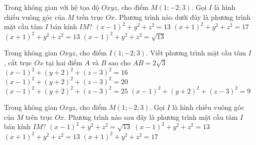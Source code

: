 \begin{ex}%
Trong không gian với hệ tọa độ $Oxyz$, cho điểm $M(1;-2;3)$. Gọi $I$ là hình chiếu vuông góc của $M$ trên trục $Ox$. Phương trình nào dưới đây là phương trình mặt cầu tâm $I$ bán kính $IM$?
\choice
{\True $(x-1)^2+y^2+z^2=13$}
{$(x+1)^2+y^2+z^2=17$}
{$(x+1)^2+y^2+z^2=13$}
{$(x-1)^2+y^2+z^2=\sqrt{13}$}
\end{ex}

\begin{ex}%
Trong không gian $Oxyz$, cho điểm $I(1;-2;3)$. Viết phương trình mặt cầu tâm $I$, cắt trục $Ox$ tại hai điểm $A$ và $B$ sao cho $AB=2\sqrt{3}$
\choice
{\True $(x-1)^2+(y+2)^2+(z-3)^2=16$}
{$(x-1)^2+(y+2)^2+(z-3)^2=20$}
{$(x-1)^2+(y+2)^2+(z-3)^2=25$}
{$(x-1)^2+(y+2)^2+(z-3)^2=9$}
\end{ex}

\begin{ex}%
Trong không gian $Oxyz$, cho điểm $M(1;-2;3)$. Gọi $I$ là hình chiếu vuông góc của $M$ trên trục $Ox$. Phương trình nào sau đây là phương trình mặt cầu tâm $I$ bán kính $IM$?
\choice
{$(x-1)^2+y^2+z^2=\sqrt{13}$}
{\True $(x-1)^2+y^2+z^2=13$}
{$(x+1)^2+y^2+z^2=13$}
{$(x+1)^2+y^2+z^2=17$}
\end{ex}

